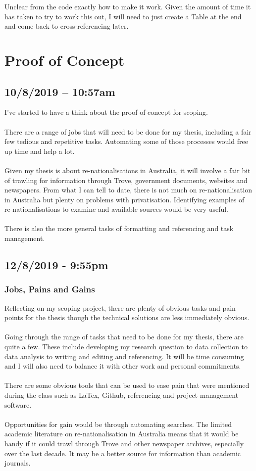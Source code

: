 \documentclass{article}
\begin{document}
Unclear from the code exactly how to make it work. Given the amount of time it has taken to try to work this out, I will need to just create a Table at the end and come back to cross-referencing later.

\newpage
\section{Proof of Concept}
\subsection*{10/8/2019 – 10:57am}
I’ve started to have a think about the proof of concept for scoping.\\\\
There are a range of jobs that will need to be done for my thesis, including a fair few tedious and repetitive tasks. Automating some of those processes would free up time and help a lot.\\\\
Given my thesis is about re-nationalisations in Australia, it will involve a fair bit of trawling for information through Trove, government documents, websites and newspapers. From what I can tell to date, there is not much on re-nationalisation in Australia but plenty on problems with privatisation. Identifying examples of re-nationalisations to examine and available sources would be very useful.\\\\
There is also the more general tasks of formatting and referencing and task management.

\subsection*{12/8/2019 - 9:55pm}
\subsubsection*{Jobs, Pains and Gains }
Reflecting on my scoping project, there are plenty of obvious tasks and pain points for the thesis though the technical solutions are less immediately obvious.\\\\
Going through the range of tasks that need to be done for my thesis, there are quite a few. These include developing my research question to data collection to data analysis to writing and editing and referencing. It will be time consuming and I will also need to balance it with other work and personal commitments.\\\\
There are some obvious tools that can be used to ease pain that were mentioned during the class such as LaTex, Github, referencing and project management software.\\\\
Opportunities for gain would be through automating searches. The limited academic literature on re-nationalisation in Australia means that it would be handy if it could trawl through Trove and other newspaper archives, especially over the last decade. It may be a better source for information than academic journals.
\end{document}
